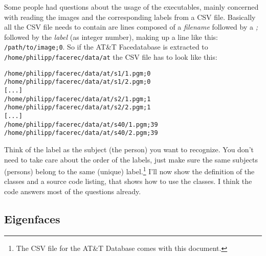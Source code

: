 Some people had questions about the usage of the executables, mainly concerned with reading the images and the corresponding labels from a CSV file. Basically all the CSV file needs to contain are lines composed of a \textit{filename} followed by a \textit{;} followed by the \textit{label} (as integer number), making up a line like this: \lstinline|/path/to/image;0|. So if the AT\&T Facedatabase is extracted to \lstinline|/home/philipp/facerec/data/at| the CSV file has to look like this:

\begin{lstlisting}
/home/philipp/facerec/data/at/s1/1.pgm;0
/home/philipp/facerec/data/at/s1/2.pgm;0
[...]
/home/philipp/facerec/data/at/s2/1.pgm;1
/home/philipp/facerec/data/at/s2/2.pgm;1
[...]
/home/philipp/facerec/data/at/s40/1.pgm;39
/home/philipp/facerec/data/at/s40/2.pgm;39
\end{lstlisting}

Think of the label as the subject (the person) you want to recognize. You don't need to take care about the order of the labels, just make sure the same subjects (persons) belong to the same (unique) label.\footnote{The CSV file for the AT\&T Database comes with this document.} I'll now show the definition of the classes and a source code listing, that shows how to use the classes. I think the code answers most of the questions already.

\subsection{Eigenfaces}

